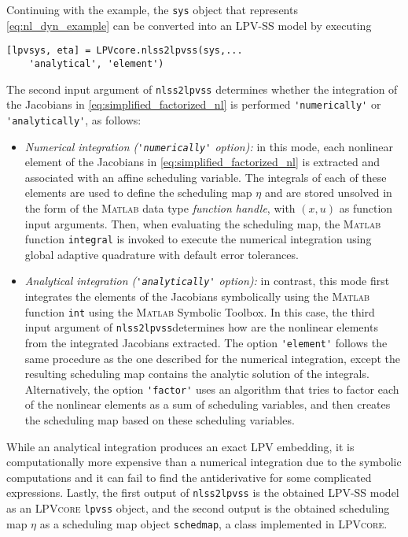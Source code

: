 Continuing with the example, the \lstinline{sys} object that represents \eqref{eq:nl_dyn_example} can be converted into an LPV-SS model by executing
%
\begin{lstlisting}[linewidth=1.01\columnwidth, basicstyle=\ttfamily]
[lpvsys, eta] = LPVcore.nlss2lpvss(sys,...
    'analytical', 'element')
\end{lstlisting}
%
The second input argument of \lstinline{nlss2lpvss} determines whether the integration of the Jacobians in \eqref{eq:simplified_factorized_nl} is performed \lstinline{'numerically'} or \mbox{\lstinline{'analytically'}}, as follows:
\begin{itemize}
    \item \textit{Numerical integration (\lstinline{'numerically'} option):} in this mode, each nonlinear element of the Jacobians in \eqref{eq:simplified_factorized_nl} is extracted and associated with an affine scheduling variable. The integrals of each of these elements are used to define the scheduling map $\eta$ and are stored unsolved in the form of the \textsc{Matlab} data type \emph{function handle}, with $(x, u)$ as function input arguments. Then, when evaluating the scheduling map, the \textsc{Matlab} function \lstinline{integral} is invoked to execute the numerical integration using global adaptive quadrature with default error tolerances.
    \item \textit{Analytical integration (\lstinline{'analytically'} option):} in contrast, this mode first integrates the elements of the Jacobians symbolically using the \textsc{Matlab} function \lstinline{int} using the \textsc{Matlab} Symbolic Toolbox. In this case, the third input argument of \lstinline{nlss2lpvss}determines how are the nonlinear elements from the integrated Jacobians extracted. The option \mbox{\lstinline{'element'}} follows the same procedure as the one described for the numerical integration, except the resulting scheduling map contains the analytic solution of the integrals. Alternatively, the option \mbox{\lstinline{'factor'}} uses an algorithm that tries to factor each of the nonlinear elements as a sum of scheduling variables, and then creates the scheduling map based on these scheduling variables.
\end{itemize}
  While an analytical integration produces an exact LPV embedding, it is computationally more expensive than a numerical integration due to the symbolic computations and it can fail to find the antiderivative for some complicated expressions. Lastly, the first output of \lstinline{nlss2lpvss} is the obtained LPV-SS model as an \textsc{LPVcore} \lstinline{lpvss} object, and the second output is the obtained scheduling map $\eta$ as a scheduling map object \lstinline{schedmap}, a class implemented in \textsc{LPVcore}.

